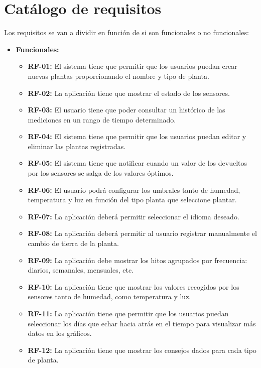 \section{Catálogo de requisitos}
Los requisitos se van a dividir en función de si son funcionales o no funcionales:

\begin{itemize}
    \item \textbf{Funcionales:}
        \begin{itemize}
            \item \textbf{RF-01:} El sistema tiene que permitir que los usuarios puedan crear nuevas plantas proporcionando el nombre y tipo de planta.
            \item \textbf{RF-02:} La aplicación tiene que mostrar el estado de los sensores.
            \item \textbf{RF-03:} El usuario tiene que poder consultar un histórico de las mediciones en un rango de tiempo determinado.
            \item \textbf{RF-04:} El sistema tiene que permitir que los usuarios puedan editar y eliminar las plantas registradas.
            \item \textbf{RF-05:} El sistema tiene que notificar cuando un valor de los devueltos por los sensores se salga de los valores óptimos.
            \item \textbf{RF-06:} El usuario podrá configurar los umbrales tanto de humedad, temperatura y luz en función del tipo planta que seleccione plantar. 
            \item \textbf{RF-07:} La aplicación deberá permitir seleccionar el idioma deseado.
            \item \textbf{RF-08:} La aplicación deberá permitir al usuario registrar manualmente el cambio de tierra de la planta.
            \item \textbf{RF-09:} La aplicación debe mostrar los hitos agrupados por frecuencia: diarios, semanales, mensuales, etc.
            \item \textbf{RF-10:} La aplicación tiene que mostrar los valores recogidos por los sensores tanto de humedad, como temperatura y luz.
            \item \textbf{RF-11:} La aplicación tiene que permitir que los usuarios puedan seleccionar los días que echar hacia atrás en el tiempo para visualizar más datos en los gráficos.
            \item \textbf{RF-12:} La aplicación tiene que mostrar los consejos dados para cada tipo de planta.

\end{itemize}
\end{itemize}
